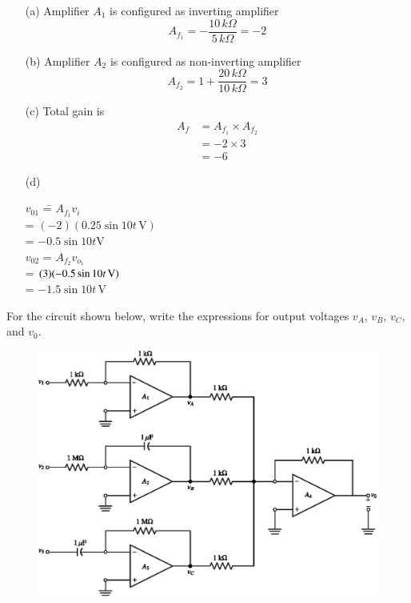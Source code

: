 \begin{solution}
\begin{itemize}
\item[(a)] Amplifier $A_{1}$ is configured as inverting amplifier
$$
A_{f_{1}}=-\dfrac{10\, k\Omega}{5\, k\Omega}=-2
$$

\item[(b)] Amplifier $A_{2}$ is configured as non-inverting amplifier
$$
A_{f_{2}}=1+\dfrac{20\, k\Omega}{10\, k\Omega}=3
$$

\item[(c)] Total gain is
\begin{align*}
A_{f} &= A_{f_{1}} \times A_{f_{2}}\\[4pt]
&= -2\times 3\\[4pt]
& =-6
\end{align*}

\item[(d)]
\begin{tabbing}
$v_{01}$  \= = $A_{f_{1}}v_{i}$\\[9pt]
         \> = $(-2)(0.25\sin 10t\,\text{V})$\\[9pt]
         \> = $-0.5\sin 10t\text{V}$\\[9pt]
$v_{02}$  \> = $A_{f_{2}}v_{o_1}$\\[9pt]
         \> = $(3)(-0.5\sin 10t\operatorname{\mathrm{V}})$\\[9pt]
         \> = $-1.5 \sin 10t\,\text{V}$
\end{tabbing}
\end{itemize}
\vskip -1cm
\end{solution}

\bigskip

\begin{example}%
For the circuit shown below, write the expressions for output voltages $v_{A}$, $v_{B}$, $v_{C}$, and $v_{0}$.
\begin{figure}[H]
\centering
\includegraphics{chap4/exp4.28.eps}
\end{figure}
\end{example}

